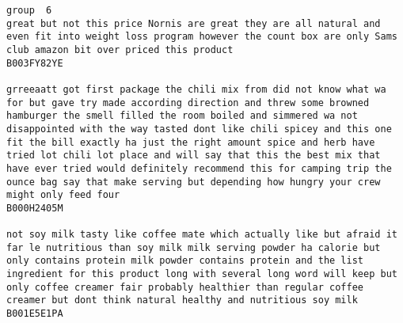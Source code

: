 \documentclass[11pt]{article}
\begin{document}
\begin{Verbatim}[commandchars=\\\{\}]
group  6
great but not this price Nornis are great they are all natural and even fit into weight loss program however the count box are only Sams club amazon bit over priced this product
B003FY82YE

grreeaatt got first package the chili mix from did not know what wa for but gave try made according direction and threw some browned hamburger the smell filled the room boiled and simmered wa not disappointed with the way tasted dont like chili spicey and this one fit the bill exactly ha just the right amount spice and herb have tried lot chili lot place and will say that this the best mix that have ever tried would definitely recommend this for camping trip the ounce bag say that make serving but depending how hungry your crew might only feed four
B000H2405M

not soy milk tasty like coffee mate which actually like but afraid it far le nutritious than soy milk milk serving powder ha calorie but only contains protein milk powder contains protein and the list ingredient for this product long with several long word will keep but only coffee creamer fair probably healthier than regular coffee creamer but dont think natural healthy and nutritious soy milk
B001E5E1PA


\end{Verbatim}
\end{document}
